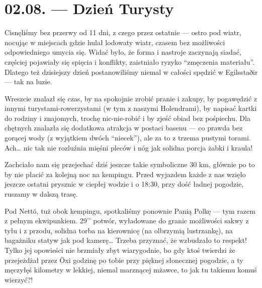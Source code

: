 \chapter*{02.08. --- Dzień Turysty}


Cisnęliśmy bez przerwy od 11 dni, z czego przez ostatnie --- ostro pod wiatr, nocując w miejscach gdzie hulał lodowaty wiatr, czasem bez możliwości odpowiedniego umycia się. Widać było, że forma i nastroje zaczynają siadać, częściej pojawiały się spięcia i konflikty, zaistniało ryzyko “zmęczenia materiału”. Dlatego też dzisiejszy dzień postanowiliśmy niemal w całości spędzić w Egilsstaðir --- tak na luzie.

Wreszcie znalazł się czas, by na spokojnie zrobić pranie i zakupy, by pogawędzić z innymi turystami-rowerzystami (w tym z naszymi Holendrami), by napisać kartki do rodziny i znajomych, trochę nic-nie-robić i by zjeść obiad bez pośpiechu. Dla chętnych znalazła się dodatkowa atrakcja w postaci basenu --- co prawda bez gorącej wody (z wyjątkiem dwóch “niecek”), ale za to z trzema pustymi torami. Ach… nic tak nie rozluźnia mięśni pleców i nóg jak solidna porcja żabki i kraula!


Zachciało nam się przejechać dziś jeszcze takie symboliczne 30 km, głównie po to by nie płacić za kolejną noc na kempingu. Przed wyjazdem każde z nas wzięło jeszcze ostatni prysznic w ciepłej wodzie i o 18:30, przy dość ładnej pogodzie, ruszamy w dalszą trasę.

Pod Nettó, tuż obok kempingu, spotkaliśmy ponownie Panią Polkę --- tym razem z pełnym ekwipunkiem. 29’’ potwór, wyładowane do granic możliwości sakwy z tyłu i z przodu, solidna torba na kierownicę (na olbrzymią lustrzankę), na bagażniku statyw jak pod kamerę… Trzeba przyznać, że wzbudzało to respekt! Tylko jej opowieści nie brzmiały zbyt wiarygodnie, bo gdy ktoś twierdzi że przejeżdżał przez Öxi godzinę po tobie przy pięknej słonecznej pogodzie, a ty męczyłęś kilometry w lekkiej, niemal marznącej mżawce, to jak tu takiemu komuś wierzyć?!


